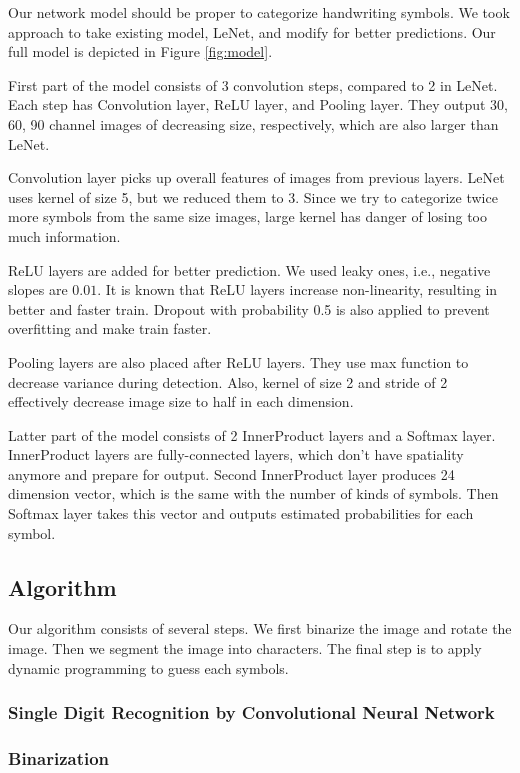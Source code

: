 \documentclass[10pt,twocolumn,letterpaper]{article}
\begin{document}
Our network model should be proper to categorize handwriting symbols. We took approach to take existing model, LeNet, and modify for better predictions. Our full model is depicted in Figure \ref{fig:model}.

First part of the model consists of 3 convolution steps, compared to 2 in LeNet. Each step has Convolution layer, ReLU layer, and Pooling layer. They output 30, 60, 90 channel images of decreasing size, respectively, which are also larger than LeNet.

Convolution layer picks up overall features of images from previous layers. LeNet uses kernel of size 5, but we reduced them to 3. Since we try to categorize twice more symbols from the same size images, large kernel has danger of losing too much information. 

ReLU layers are added for better prediction. We used leaky ones, i.e., negative slopes are $0.01$. It is known that ReLU layers increase non-linearity, resulting in better and faster train. Dropout with probability 0.5 is also applied to prevent overfitting and make train faster.

Pooling layers are also placed after ReLU layers. They use max function to decrease variance during detection. Also, kernel of size 2 and stride of 2 effectively decrease image size to half in each dimension.

Latter part of the model consists of 2 InnerProduct layers and a Softmax layer. InnerProduct layers are fully-connected layers, which don't have spatiality anymore and prepare for output. Second InnerProduct layer produces 24 dimension vector, which is the same with the number of kinds of symbols. Then Softmax layer takes this vector and outputs estimated probabilities for each symbol.

\subsection{Algorithm}

Our algorithm consists of several steps. We first binarize the image and rotate the image.
Then we segment the image into characters.
The final step is to apply dynamic programming to guess each symbols.

\subsubsection{Single Digit Recognition by Convolutional Neural Network}

\subsubsection{Binarization}
\end{document}
